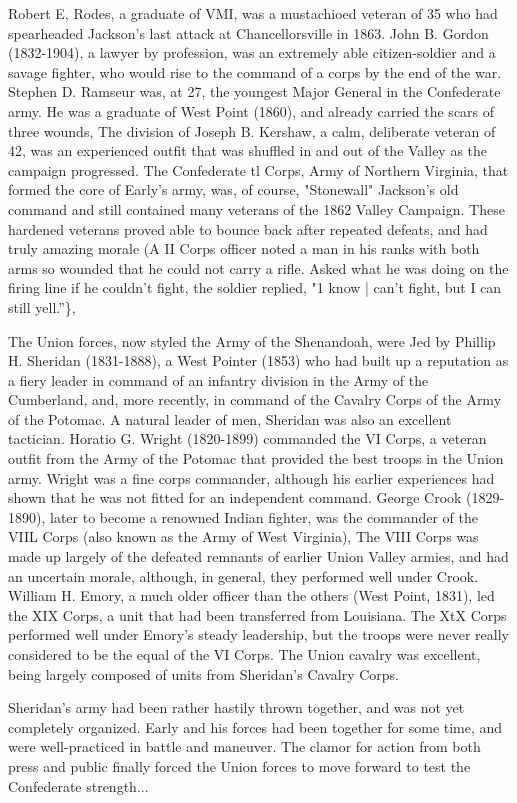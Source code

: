Robert E, Rodes, a graduate of VMI, was a mustachioed veteran of 35 who had spearheaded Jackson's last attack at Chancellorsville in 1863. John B. Gordon (1832-1904), a lawyer by profession, was an extremely able citizen-soldier and a savage fighter, who would rise to the command of a corps by the end of the war. Stephen D. Ramseur was, at 27, the youngest Major General in the Confederate army. He was a graduate of West Point (1860), and already carried the scars of three wounds, The division of Joseph B. Kershaw, a calm, deliberate veteran of 42, was an experienced outfit that was shuffled in and out of the Valley as the campaign progressed. The Confederate tl Corps, Army of Northern Virginia, that formed the core of Early's army, was, of course, "Stonewall" Jackson's old command and still contained many veterans of the 1862 Valley Campaign. These hardened veterans proved able to bounce back after repeated defeats, and had truly amazing morale (A II Corps officer noted a man in his ranks with both arms so wounded that he could not carry a rifle. Asked what he was doing on the firing line if he couldn't fight, the soldier replied, "1 know | can't fight, but I can still yell.''\},

The Union forces, now styled the Army of the Shenandoah, were Jed by Phillip H. Sheridan (1831-1888), a West Pointer (1853) who had built up a reputation as a fiery leader in command of an infantry division in the Army of the Cumberland, and, more recently, in command of the Cavalry Corps of the Army of the Potomac. A natural leader of men, Sheridan was also an excellent tactician. Horatio G. Wright (1820-1899) commanded the VI Corps, a veteran outfit from the Army of the Potomac that provided the best troops in the Union army. Wright was a fine corps commander, although his earlier experiences had shown that he was not fitted for an independent command. George Crook (1829-1890), later to become a renowned Indian fighter, was the commander of the VIIL Corps (also known as the Army of West Virginia), The VIII Corps was made up largely of the defeated remnants of earlier Union Valley armies, and had an uncertain morale, although, in general, they performed well under Crook. William H. Emory, a much older officer than the others (West Point, 1831), led the XIX Corps, a unit that had been transferred from Louisiana. The XtX Corps performed well under Emory's steady leadership, but the troops were never really considered to be the equal of the VI Corps. The Union cavalry was excellent, being largely composed of units from Sheridan's Cavalry Corps.

Sheridan's army had been rather hastily thrown together, and was not yet completely organized. Early and his forces had been together for some time, and were well-practiced in battle and maneuver. The clamor for action from both press and public finally forced the Union forces to move forward to test the Confederate strength...

